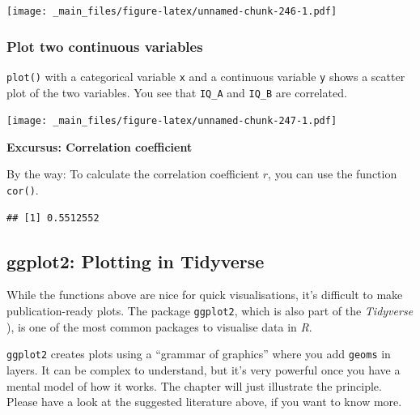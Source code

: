 \documentclass[
]{scrartcl}
\newenvironment{Shaded}{\begin{snugshade}}{\end{snugshade}}
\newcommand{\AttributeTok}[1]{\textcolor[rgb]{0.13,0.29,0.53}{#1}}
\newcommand{\FunctionTok}[1]{\textcolor[rgb]{0.13,0.29,0.53}{\textbf{#1}}}
\newcommand{\NormalTok}[1]{#1}
\newcommand{\SpecialCharTok}[1]{\textcolor[rgb]{0.81,0.36,0.00}{\textbf{#1}}}
\newenvironment{webexsolution}[1]
    {\par\tiny\textbf{#1}}
    {\par}
\newcommand{\webexhide}[1]{\begin{webexsolution}{#1}}
\newcommand{\webexunhide}{\end{webexsolution}}
\begin{document}
\texttt{[image: \_main\_files/figure-latex/unnamed-chunk-246-1.pdf]}

\subsubsection{Plot two continuous variables}\label{plot-two-continuous-variables}

\texttt{plot()} with a categorical variable \texttt{x} and a continuous variable \texttt{y} shows a scatter plot of the two variables. You see that \texttt{IQ\_A} and \texttt{IQ\_B} are correlated.

\begin{Shaded}
\end{Shaded}

\texttt{[image: \_main\_files/figure-latex/unnamed-chunk-247-1.pdf]}
\webexhide{Excursus: Correlation coefficient}

By the way: To calculate the correlation coefficient \(r\), you can use the function \texttt{cor()}.

\begin{Shaded}
\end{Shaded}

\begin{verbatim}
## [1] 0.5512552
\end{verbatim}

\webexunhide

\subsection{ggplot2: Plotting in Tidyverse}\label{ggplot2-plotting-in-tidyverse}

While the functions above are nice for quick visualisations, it's difficult to make publication-ready plots. The package \texttt{ggplot2}, which is also part of the \emph{Tidyverse} ), is one of the most common packages to visualise data in \emph{R}.

\texttt{ggplot2} creates plots using a ``grammar of graphics'' where you add \texttt{geoms} in layers. It can be complex to understand, but it's very powerful once you have a mental model of how it works. The chapter will just illustrate the principle. Please have a look at the suggested literature above, if you want to know more.
\end{document}
